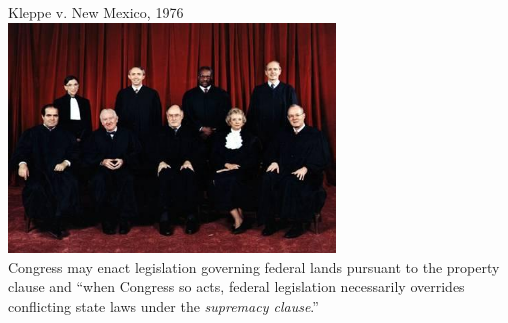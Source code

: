 \begin{frame}{Kleppe v. New Mexico, 1976}
    \centering
    \includegraphics[width=0.65\textwidth]{img/sc-1976.png} \\
    Congress may enact legislation governing federal lands pursuant to the
    property clause and ``when Congress so acts, federal legislation
    necessarily overrides conflicting state laws under the \emph{supremacy
    clause}.''
\end{frame}

